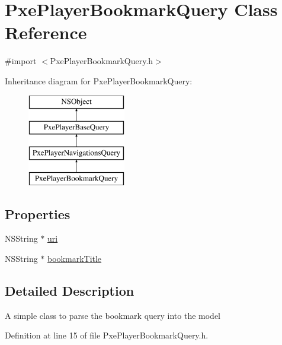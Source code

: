 \hypertarget{interface_pxe_player_bookmark_query}{\section{Pxe\-Player\-Bookmark\-Query Class Reference}
\label{interface_pxe_player_bookmark_query}
}


{\ttfamily \#import $<$Pxe\-Player\-Bookmark\-Query.\-h$>$}

Inheritance diagram for Pxe\-Player\-Bookmark\-Query\-:\begin{figure}[H]
\begin{center}
\leavevmode
\includegraphics[height=4.000000cm]{interface_pxe_player_bookmark_query}
\end{center}
\end{figure}
\subsection*{Properties}
\begin{DoxyCompactItemize}
\item 
N\-S\-String $\ast$ \hyperlink{interface_pxe_player_bookmark_query_a52ea08981cbaffa901c59c4a2c855b9d}{uri}
\item 
N\-S\-String $\ast$ \hyperlink{interface_pxe_player_bookmark_query_a5bd099d87fc02e4872023d4755e431e3}{bookmark\-Title}
\end{DoxyCompactItemize}


\subsection{Detailed Description}
A simple class to parse the bookmark query into the model 

Definition at line 15 of file Pxe\-Player\-Bookmark\-Query.\-h.



